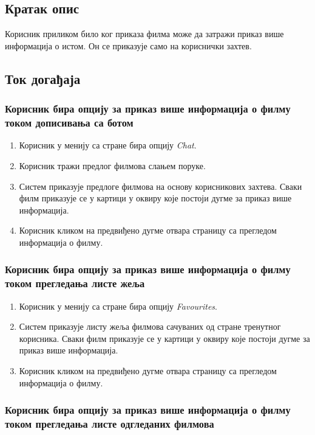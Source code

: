 \subsection{Кратак опис}

Корисник приликом било ког приказа филма може да затражи приказ више информација о истом. Он се приказује само на кориснички захтев.

\subsection{Ток догађаја}

\subsubsection{Корисник бира опцију за приказ више информација о филму током дописивања са ботом}

\begin{enumerate}
    \item Корисник у менију са стране бира опцију \textit{Chat}.
    \item Корисник тражи предлог филмова слањем поруке.
    \item Систем приказује предлоге филмова на основу корисникових захтева. Сваки филм приказује се у картици 
    у оквиру које постоји дугме за приказ више информација.
    \item Корисник кликом на предвиђено дугме отвара страницу са прегледом информација о филму.
\end{enumerate}

\subsubsection{Корисник бира опцију за приказ више информација о филму током прегледања листе жеља}

\begin{enumerate}
    \item Корисник у менију са стране бира опцију \textit{Favourites}.
    \item Систем приказује листу жеља филмова сачуваних од стране тренутног корисника. Сваки филм 
    приказује се у картици у оквиру које постоји дугме за приказ више информација.
    \item Корисник кликом на предвиђено дугме отвара страницу са прегледом информација о филму.
\end{enumerate}

\subsubsection{Корисник бира опцију за приказ више информација о филму током прегледања листе одгледаних филмова}

